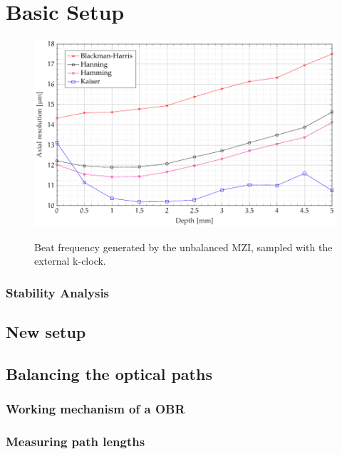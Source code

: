 \section{Basic Setup}




\begin{figure}[hbt]
{\myfloatalign
\includegraphics[width=\linewidth]{gfx/ch3/risoluzione-profondita}}
\caption{Beat frequency generated by the unbalanced \ac{MZI}, sampled with the external k-clock.}\label{fig:mzi-external}
\end{figure}


\subsubsection{Stability Analysis}


\subsection{New setup}

\subsection{Balancing the optical paths}

\subsubsection{Working mechanism of a OBR}

\subsubsection{Measuring path lengths}


